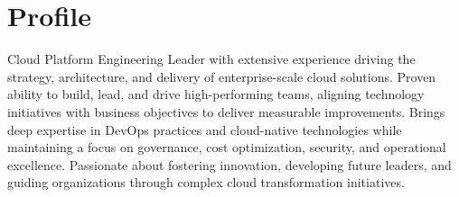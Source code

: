 \section{Profile}
Cloud Platform Engineering Leader with extensive experience driving the strategy, 
architecture, and delivery of enterprise-scale cloud solutions. Proven ability to 
build, lead, and drive high-performing teams, aligning technology initiatives 
with business objectives to deliver measurable improvements. Brings deep expertise 
in DevOps practices and cloud-native technologies while maintaining a focus on 
governance, cost optimization, security, and operational excellence. Passionate 
about fostering innovation, developing future leaders, and guiding organizations 
through complex cloud transformation initiatives.
\closesection{}
